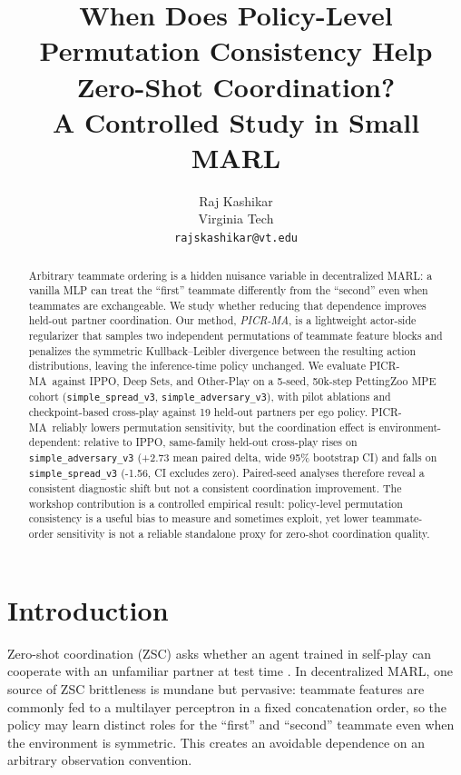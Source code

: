 \documentclass{article}
\title{When Does Policy-Level Permutation Consistency Help Zero-Shot Coordination?\\A Controlled Study in Small MARL}
\author{%
  Raj Kashikar \\
  Virginia Tech \\
  \texttt{rajskashikar@vt.edu}
}
\newcommand{\method}{PICR-MA}
\begin{document}
\maketitle

\begin{abstract}
Arbitrary teammate ordering is a hidden nuisance variable in decentralized MARL: a vanilla MLP can treat the ``first'' teammate differently from the ``second'' even when teammates are exchangeable. We study whether reducing that dependence improves held-out partner coordination. Our method, \emph{PICR-MA}, is a lightweight actor-side regularizer that samples two independent permutations of teammate feature blocks and penalizes the symmetric Kullback--Leibler divergence between the resulting action distributions, leaving the inference-time policy unchanged. We evaluate \method\ against IPPO, Deep Sets, and Other-Play on a 5-seed, 50k-step PettingZoo MPE cohort (\texttt{simple\_spread\_v3}, \texttt{simple\_adversary\_v3}), with pilot ablations and checkpoint-based cross-play against 19 held-out partners per ego policy. \method\ reliably lowers permutation sensitivity, but the coordination effect is environment-dependent: relative to IPPO, same-family held-out cross-play rises on \texttt{simple\_adversary\_v3} (+2.73 mean paired delta, wide 95\% bootstrap CI) and falls on \texttt{simple\_spread\_v3} (-1.56, CI excludes zero). Paired-seed analyses therefore reveal a consistent diagnostic shift but not a consistent coordination improvement. The workshop contribution is a controlled empirical result: policy-level permutation consistency is a useful bias to measure and sometimes exploit, yet lower teammate-order sensitivity is not a reliable standalone proxy for zero-shot coordination quality.
\end{abstract}

\section{Introduction}
Zero-shot coordination (ZSC) asks whether an agent trained in self-play can cooperate with an unfamiliar partner at test time \citep{hu2020otherplay}. In decentralized MARL, one source of ZSC brittleness is mundane but pervasive: teammate features are commonly fed to a multilayer perceptron in a fixed concatenation order, so the policy may learn distinct roles for the ``first'' and ``second'' teammate even when the environment is symmetric. This creates an avoidable dependence on an arbitrary observation convention.
\end{document}
